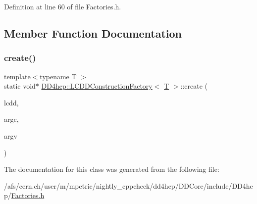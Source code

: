 Definition at line 60 of file Factories.\+h.



\subsection{Member Function Documentation}
\hypertarget{class_d_d4hep_1_1_l_c_d_d_construction_factory_aa6fda027eb3dbfc490d9daad93ea18a0}{}\label{class_d_d4hep_1_1_l_c_d_d_construction_factory_aa6fda027eb3dbfc490d9daad93ea18a0} 
\subsubsection{\texorpdfstring{create()}{create()}}
{\footnotesize\ttfamily template$<$typename T $>$ \\
static void$\ast$ \hyperlink{class_d_d4hep_1_1_l_c_d_d_construction_factory}{D\+D4hep\+::\+L\+C\+D\+D\+Construction\+Factory}$<$ \hyperlink{class_t}{T} $>$\+::create (\begin{DoxyParamCaption}\item[{\hyperlink{class_d_d4hep_1_1_geometry_1_1_l_c_d_d}{Geometry\+::\+L\+C\+DD} \&}]{lcdd,  }\item[{int}]{argc,  }\item[{char $\ast$$\ast$}]{argv }\end{DoxyParamCaption})\hspace{0.3cm}{\ttfamily [static]}}



The documentation for this class was generated from the following file\+:\begin{DoxyCompactItemize}
\item 
/afs/cern.\+ch/user/m/mpetric/nightly\+\_\+cppcheck/dd4hep/\+D\+D\+Core/include/\+D\+D4hep/\hyperlink{_d_d_core_2include_2_d_d4hep_2_factories_8h}{Factories.\+h}\end{DoxyCompactItemize}
